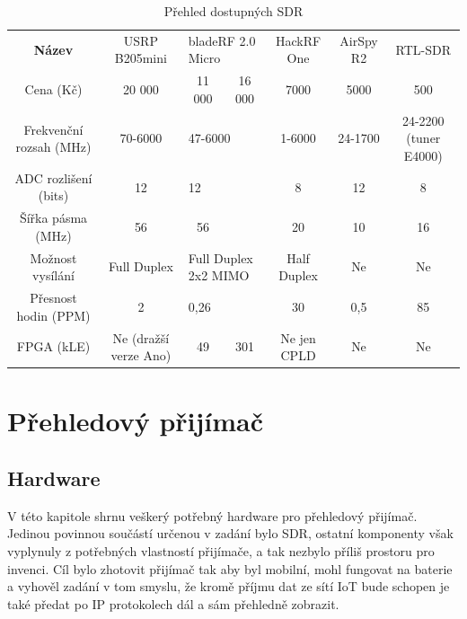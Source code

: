 \documentclass{ctuthesis}
\begin{document}
\begin{table}
\begin{ctucolortab}
\begin{tabular}{c|cccccc}
\bfseries
Název                   & USRP B205mini         & \multicolumn{2}{l}{bladeRF 2.0 Micro}    & HackRF One  & AirSpy R2 & RTL-SDR \\ \Midrule
Cena (Kč)               & 20 000                & 11 000              & 16 000             & 7000        & 5000      & 500     \\
Frekvenční rozsah (MHz) & 70-6000               & \multicolumn{2}{l}{47-6000}              & 1-6000      & 24-1700   & 24-2200 (tuner E4000) \\
ADC rozlišení (bits)    & 12                    & \multicolumn{2}{l}{12}                   & 8           & 12        & 8       \\
Šířka pásma (MHz)       & 56                    & 56                  &                    & 20          & 10        & 16      \\
Možnost vysílání        & Full Duplex           & \multicolumn{2}{l}{Full Duplex 2x2 MIMO} & Half Duplex & Ne        & Ne      \\
Přesnost hodin (PPM)    & 2                     & \multicolumn{2}{l}{0,26}                 & 30          & 0,5       & 85      \\
FPGA (kLE)              & Ne (dražší verze Ano) & 49                  & 301                & Ne jen CPLD & Ne        & Ne      \\ 
\end{tabular}
\end{ctucolortab}
\caption{Přehled dostupných SDR}
\label{tab:sdr}
\cite{etusresearch}
\cite{sdrreview2016}
\cite{itead}
\cite{sdrshowdown}
\end{table}


\part{Přehledový přijímač}
\chapter{Hardware}
V této kapitole shrnu veškerý potřebný hardware pro přehledový přijímač.\\
 Jedinou povinnou součástí určenou v zadání bylo SDR, ostatní komponenty však vyplynuly z potřebných vlastností přijímače, a tak nezbylo příliš prostoru pro invenci. Cíl bylo zhotovit přijímač tak aby byl mobilní, mohl fungovat na baterie a vyhověl zadání v tom smyslu, že kromě příjmu dat ze sítí IoT bude schopen je také předat po IP protokolech dál a sám přehledně zobrazit.
\end{document}
